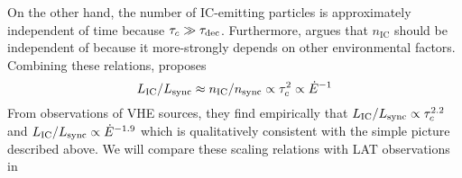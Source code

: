 On the other hand, the number of \ac{IC}-emitting particles
is approximately independent of time because $\tau_c \gg
\tau_\text{dec}$.  Furthermore, \cite{mattana_2009_evolution-gamma-}
argues that $n_\text{IC}$ should be independent of \energydot because it
more-strongly depends on other environmental factors.  Combining these
relations, \cite{mattana_2009_evolution-gamma-} proposes
\begin{equation}
  L_\text{IC}/L_\text{sync} \approx n_\text{IC}/n_\text{sync}
  \propto \tau_c^2 \propto \dot{E}^{-1}
\end{equation}
From observations of \ac{VHE} sources, they find empirically
that $L_\text{IC}/L_\text{sync} \propto
\tau_c^{2.2}$ and $L_\text{IC}/L_\text{sync}
\propto \dot{E}^{-1.9}$ which is qualitatively consistent with the
simple picture described above.  We will compare these scaling relations
with \ac{LAT} observations in 

